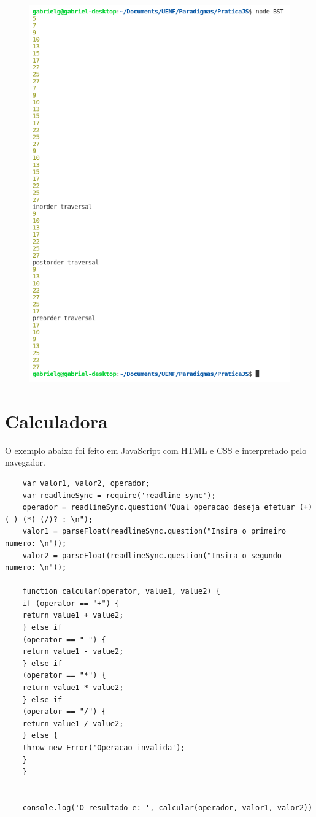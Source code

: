     \begin{figure}[h]
    	\centering
    	\includegraphics[width=0.9\linewidth]{Pictures/BST_Result}
    	\caption{}
    	\label{fig:bstresult}
    \end{figure}
    


    \section{Calculadora}
    O exemplo abaixo foi feito em JavaScript com HTML e CSS e interpretado pelo navegador.
    \begin{lstlisting}
    var valor1, valor2, operador;
    var readlineSync = require('readline-sync');
    operador = readlineSync.question("Qual operacao deseja efetuar (+) (-) (*) (/)? : \n");
    valor1 = parseFloat(readlineSync.question("Insira o primeiro numero: \n"));
    valor2 = parseFloat(readlineSync.question("Insira o segundo numero: \n"));
    
    function calcular(operator, value1, value2) {
    if (operator == "+") {
    return value1 + value2;
    } else if
    (operator == "-") {
    return value1 - value2;
    } else if
    (operator == "*") {
    return value1 * value2;
    } else if
    (operator == "/") {
    return value1 / value2;
    } else {
    throw new Error('Operacao invalida');
    }
    }
    
    
    console.log('O resultado e: ', calcular(operador, valor1, valor2))     
    \end{lstlisting}
    
